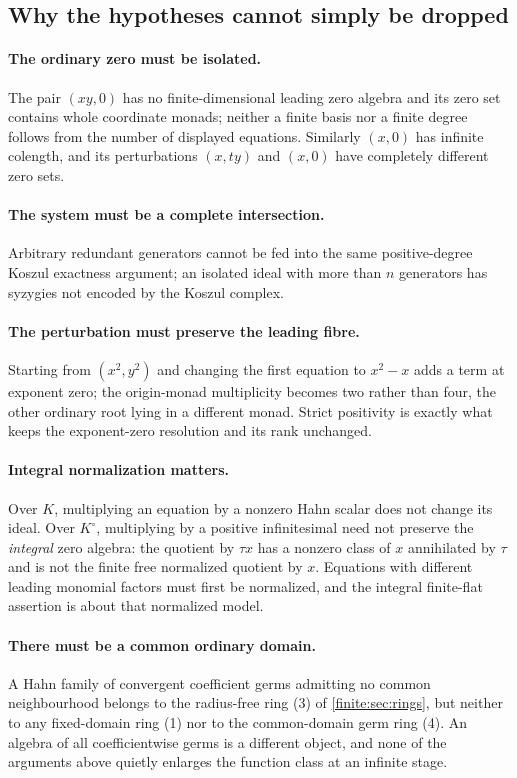 \documentclass[11pt,letterpaper]{article}
\theoremstyle{definition}
\theoremstyle{remark}
\newcommand{\Kc}{K^{\circ}}
\numberwithin{equation}{section}
\begin{document}
\subsection{Why the hypotheses cannot simply be dropped}
\label{finite:sec:hypotheses}

\paragraph{The ordinary zero must be isolated.} The pair $(xy,0)$ has no finite-dimensional leading zero algebra and its zero set contains whole coordinate monads; neither a finite basis nor a finite degree follows from the number of displayed equations. Similarly $(x,0)$ has infinite colength, and its perturbations $(x,ty)$ and $(x,0)$ have completely different zero sets.

\paragraph{The system must be a complete intersection.} Arbitrary redundant generators cannot be fed into the same positive-degree Koszul exactness argument; an isolated ideal with more than $n$ generators has syzygies not encoded by the Koszul complex.

\paragraph{The perturbation must preserve the leading fibre.} Starting from $(x^2,y^2)$ and changing the first equation to $x^2-x$ adds a term at exponent zero; the origin-monad multiplicity becomes two rather than four, the other ordinary root lying in a different monad. Strict positivity is exactly what keeps the exponent-zero resolution and its rank unchanged.

\paragraph{Integral normalization matters.} Over $K$, multiplying an equation by a nonzero Hahn scalar does not change its ideal. Over $\Kc$, multiplying by a positive infinitesimal need not preserve the \emph{integral} zero algebra: the quotient by $\tau x$ has a nonzero class of $x$ annihilated by $\tau$ and is not the finite free normalized quotient by $x$. Equations with different leading monomial factors must first be normalized, and the integral finite-flat assertion is about that normalized model.

\paragraph{There must be a common ordinary domain.} A Hahn family of convergent coefficient germs admitting no common neighbourhood belongs to the radius-free ring (3) of \cref{finite:sec:rings}, but neither to any fixed-domain ring (1) nor to the common-domain germ ring (4). An algebra of all coefficientwise germs is a different object, and none of the arguments above quietly enlarges the function class at an infinite stage.
\end{document}
